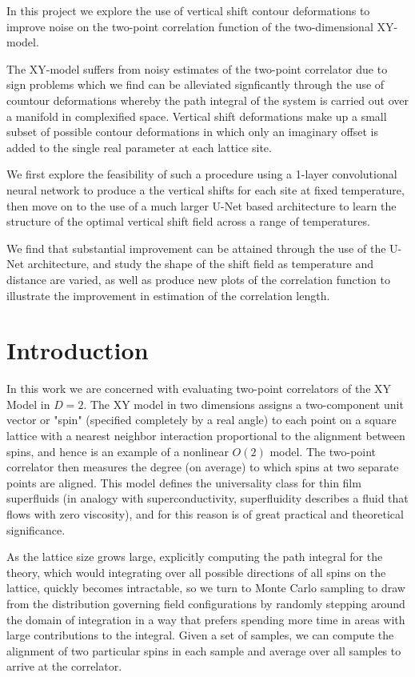 \documentclass[12pt]{article}
\begin{document}
In this project we explore the use of vertical shift contour deformations to improve noise on the two-point correlation function of the
two-dimensional XY-model.

The XY-model suffers from noisy estimates of the two-point correlator due to sign problems which we find can be alleviated signficantly through
the use of countour deformations whereby the path integral of the system is carried out over a manifold in complexified space. Vertical shift deformations
make up a small subset of possible contour deformations in which only an imaginary offset is added to the single real parameter at each lattice site.

We first explore the feasibility of such a procedure using a 1-layer convolutional neural network to produce a the vertical shifts for each site at fixed temperature,
then move on to the use of a much larger U-Net based architecture to learn the structure of the optimal vertical shift field across a range of temperatures.

We find that substantial improvement can be attained through the use of the U-Net architecture, and study the shape of the shift field as temperature and
distance are varied, as well as produce new plots of the correlation function to illustrate the improvement in estimation of the correlation length.


\newpage

\tableofcontents

\newpage

\section{Introduction}

In this work we are concerned with evaluating two-point correlators of the XY Model in $D=2$. The XY model in two dimensions assigns a two-component unit vector or "spin"
(specified completely by a real angle) to each point on a square lattice with a nearest neighbor interaction proportional to the alignment between spins, and hence is an example of a 
nonlinear $O(2)$ model. The two-point correlator then measures the degree (on average) to which spins at two separate points are aligned.
This model defines the universality class for thin film superfluids (in analogy with superconductivity, superfluidity describes a fluid that flows with zero viscosity), 
and for this reason is of great practical and theoretical significance.

As the lattice size grows large, explicitly computing the path integral for the theory, which would integrating over all possible directions of all spins on the lattice,
quickly becomes intractable, so we turn to Monte Carlo sampling to draw from the distribution governing field configurations by randomly stepping around the domain
of integration in a way that prefers spending more time in areas with large contributions to the integral. Given a set of samples, we can compute the alignment of two
particular spins in each sample and average over all samples to arrive at the correlator.
\end{document}
